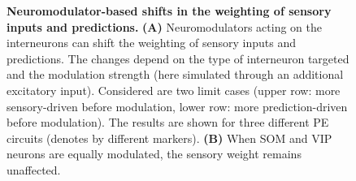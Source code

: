 \documentclass[10pt,a4paper]{article}
\begin{document}
\begin{figure}[t!]
	\centering
\caption{\footnotesize{\bf Neuromodulator-based shifts in the weighting of sensory inputs and predictions.
\newline} 
{\bf (A)} Neuromodulators acting on the interneurons can shift the weighting of sensory inputs and predictions. The changes depend on the type of interneuron targeted and the modulation strength (here simulated through an additional excitatory input). Considered are two limit cases (upper row: more sensory-driven before modulation, lower row: more prediction-driven before modulation). The results are shown for three different PE circuits (denotes by different markers).
{\bf (B)} When SOM and VIP neurons are equally modulated, the sensory weight remains unaffected. 
}
\end{figure}
\end{document}
